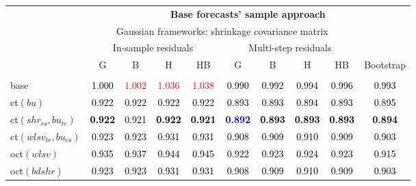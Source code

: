 
\begin{tabular}[t]{>{\centering\arraybackslash}m{2.5cm}ccccccccc}
\toprule
\multicolumn{1}{c}{\textbf{}} & \multicolumn{9}{c}{\textbf{Base forecasts' sample approach}} \\
\cmidrule(l{0pt}r{0pt}){2-10}
\multicolumn{1}{c}{} & \multicolumn{8}{c}{Gaussian frameworks: shrinkage covariance matrix} & \multicolumn{1}{c}{} \\
\multicolumn{1}{c}{} & \multicolumn{4}{c}{In-sample residuals} & \multicolumn{4}{c}{Multi-step residuals} & \multicolumn{1}{c}{} \\
\multirow{-5}{*}{\parbox{2cm}{\centering\textbf{Reconciliation\\approach}}} & G & B & H & HB & G & B & H & HB & \multirow{-4}{*}{Bootstrap}\\
\midrule
\addlinespace[0.3em]
\multicolumn{10}{c}{\textbf{$\forall k \in \{2,1\}$}}\\
base & \textcolor{black}{1.000} & \textcolor{red}{1.002} & \textcolor{red}{1.036} & \textcolor{red}{1.038} & \textcolor{black}{0.990} & \textcolor{black}{0.992} & \textcolor{black}{0.994} & \textcolor{black}{0.996} & \textcolor{black}{0.993}\\
ct$(bu)$ & \textcolor{black}{0.922} & \textcolor{black}{0.922} & \textcolor{black}{0.922} & \textcolor{black}{0.922} & \textcolor{black}{0.893} & \textcolor{black}{0.893} & \textcolor{black}{0.894} & \textcolor{black}{0.893} & \textcolor{black}{0.895}\\
ct$(shr_{cs}, bu_{te})$ & \textcolor{black}{\textbf{0.922}} & \textcolor{black}{0.921} & \textcolor{black}{\textbf{0.922}} & \textcolor{black}{\textbf{0.921}} & \textcolor{blue}{\textbf{0.892}} & \textcolor{black}{\textbf{0.893}} & \textcolor{black}{\textbf{0.893}} & \textcolor{black}{\textbf{0.893}} & \textcolor{black}{\textbf{0.894}}\\
ct$(wlsv_{te}, bu_{cs})$ & \textcolor{black}{0.923} & \textcolor{black}{0.923} & \textcolor{black}{0.931} & \textcolor{black}{0.931} & \textcolor{black}{0.908} & \textcolor{black}{0.909} & \textcolor{black}{0.910} & \textcolor{black}{0.909} & \textcolor{black}{0.903}\\
oct$(wlsv)$ & \textcolor{black}{0.935} & \textcolor{black}{0.937} & \textcolor{black}{0.944} & \textcolor{black}{0.945} & \textcolor{black}{0.922} & \textcolor{black}{0.923} & \textcolor{black}{0.924} & \textcolor{black}{0.923} & \textcolor{black}{0.915}\\
oct$(bdshr)$ & \textcolor{black}{0.923} & \textcolor{black}{0.923} & \textcolor{black}{0.931} & \textcolor{black}{0.931} & \textcolor{black}{0.908} & \textcolor{black}{0.909} & \textcolor{black}{0.910} & \textcolor{black}{0.909} & \textcolor{black}{0.903}\\

\end{tabular}
